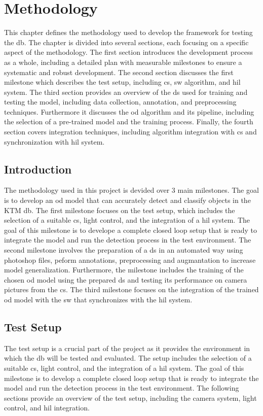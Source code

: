 

\chapter{Methodology} \label{ch:methodology}
This chapter defines the methodology used to develop the framework for testing the \gls{db}. The chapter is divided into several sections, each focusing on a specific aspect of the methodology. The first section introduces the development process as a whole, including a detailed plan with measurable milestones to ensure a systematic and robust development. The  second section discusses the first milestone which describes the test setup, including \gls{cs}, \gls{sw} algorithm, and \gls{hil} system. The third section provides an overview of the \gls{ds} used for training and testing the model, including data collection, annotation, and preprocessing techniques. Furthermore it discusses the \gls{od} algorithm and its pipeline, including the selection of a pre-trained model and the training process. Finally, the fourth section covers integration techniques, including algorithm integration with \gls{cs} and synchronization with \gls{hil} system.

\section{Introduction}
The methodology used in this project is devided over 3 main milestones. The goal is to develop an \gls{od} model that can accurately detect and classify objects in the KTM \gls{db}. The first milestone focuses on the test setup, which includes the selection of a suitable \gls{cs}, light control, and the integration of a \gls{hil} system. The goal of this milestone is to develope a complete closed loop setup that is ready to integrate the model and run the detection process in the test environment. The second milestone involves the preparation of a \gls{ds} in an automated way using photoshop files, peform annotations, preprocessing and augmantation to increase model generalization. Furthermore, the  milestone includes the training of the chosen \gls{od} model using the prepared \gls{ds} and testing its performance on camera pictures from the \gls{cs}. The third milestone focuses on the integration of the trained \gls{od} model with the \gls{sw} that synchronizes with the \gls{hil} system.

\section{Test Setup}
The test setup is a crucial part of the project as it provides the environment in which the \gls{db} will be tested and evaluated. The setup includes the selection of a suitable \gls{cs}, light control, and the integration of a \gls{hil} system. The goal of this milestone is to develop a complete closed loop setup that is ready to integrate the model and run the detection process in the test environment. The following sections provide an overview of the test setup, including the camera system, light control, and \gls{hil} integration.

